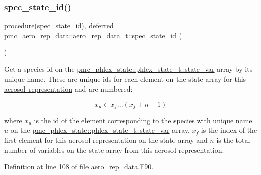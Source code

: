 \mbox{\label{structpmc__aero__rep__data_1_1aero__rep__data__t_a6dcaf48caeaaed60aa065a0fac6c7ffc}} 
\subsubsection{\texorpdfstring{spec\+\_\+state\+\_\+id()}{spec\_state\_id()}}
{\footnotesize\ttfamily procedure(\mbox{\hyperlink{interfacepmc__aero__rep__data_1_1spec__state__id}{spec\+\_\+state\+\_\+id}}), deferred pmc\+\_\+aero\+\_\+rep\+\_\+data\+::aero\+\_\+rep\+\_\+data\+\_\+t\+::spec\+\_\+state\+\_\+id (\begin{DoxyParamCaption}{ }\end{DoxyParamCaption})\hspace{0.3cm}{\ttfamily [private]}}



Get a species id on the {\ttfamily \mbox{\hyperlink{structpmc__phlex__state_1_1phlex__state__t_a78835cb552d483ebbfc7a6bc6f756918}{pmc\+\_\+phlex\+\_\+state\+::phlex\+\_\+state\+\_\+t\+::state\+\_\+var}}} array by its unique name. These are unique ids for each element on the state array for this \mbox{\hyperlink{phlex_aero_rep}{aerosol representation}} and are numbered\+: 

\[x_u \in x_f ... (x_f+n-1)\]

where $x_u$ is the id of the element corresponding to the species with unique name $u$ on the {\ttfamily \mbox{\hyperlink{structpmc__phlex__state_1_1phlex__state__t_a78835cb552d483ebbfc7a6bc6f756918}{pmc\+\_\+phlex\+\_\+state\+::phlex\+\_\+state\+\_\+t\+::state\+\_\+var}}} array, $x_f$ is the index of the first element for this aerosol representation on the state array and $n$ is the total number of variables on the state array from this aerosol representation. 

Definition at line 108 of file aero\+\_\+rep\+\_\+data.\+F90.

\mbox{\label{structpmc__aero__rep__data_1_1aero__rep__data__t_a96fbf02225909dc0c2eccec4895c98ac}} 
